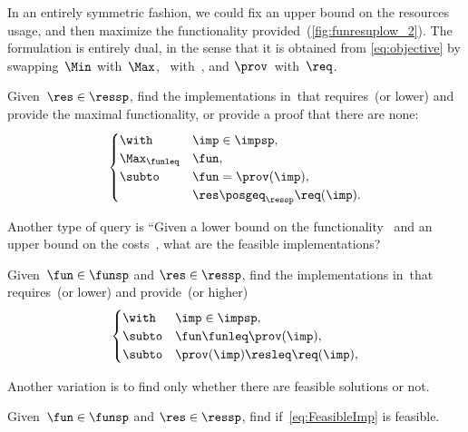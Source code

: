 In an entirely symmetric fashion, we could fix an upper bound on
the resources usage, and then maximize the functionality provided~(\cref{fig:funresuplow_2}).
The formulation is entirely dual, in the sense that it is obtained
from \cref{eq:objective} by swapping~$\Min$ with~$\Max$, \funsp~with~\ressp,
and $\prov$~with~$\req$.

\begin{problem}[\FixResMaxFun]
    \label{prob:FixResMaxFun}
    Given~$\res\in\ressp$, find the implementations
    in~\impsp that requires~\res (or lower)
    and provide the maximal functionality, or provide a proof that there are none:
    \begin{equation}
        \begin{cases}
            \with & \imp\in\impsp,\\
            \Max_{\funleq} & \fun,\\
            \subto & \fun=\prov(\imp),\\
            & \res\posgeq_{\ressp}\req(\imp).
        \end{cases}\label{eq:objective-1}
    \end{equation}
\end{problem}


\begin{figure*}
    \centering
    \caption{}
    \label{fig:funresuplow_2}
\end{figure*}


Another type of query is
``Given a lower bound on the functionality~\fun
and an upper bound on the costs~\fun, what are the feasible implementations?


\begin{problem}[\FeasibleImp]
    \label{prob:FeasibleImp}
    Given~$\fun\in\funsp$ and $\res\in\ressp$, find the implementations
    in~\impsp that requires~\res (or lower)
    and provide~\fun (or higher)
    \begin{equation}
        \label{eq:FeasibleImp}
        \begin{cases}
            \with & \imp\in\impsp,\\
            \subto & \fun \funleq \prov(\imp),\\
            \subto &  \prov(\imp) \resleq \req(\imp) ,\\
        \end{cases}
    \end{equation}
\end{problem}

Another variation is to find only whether there are feasible solutions or not.

\begin{problem}[\Feasibility]
    \label{prob:Feasibility}
    Given~$\fun\in\funsp$ and $\res\in\ressp$, find if~\cref{eq:FeasibleImp} is feasible.
\end{problem}
